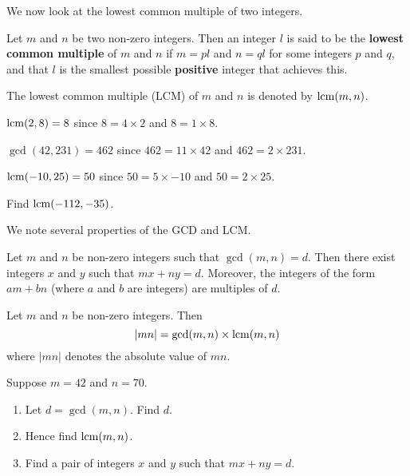 We now look at the lowest common multiple of two integers.
\begin{definition}
    Let $m$ and $n$ be two non-zero integers. Then an integer $l$ is said to be the \textbf{lowest common multiple} of $m$ and $n$ if $m = pl$ and $n = ql$ for some integers $p$ and $q$, and that $l$ is the smallest possible \textbf{positive} integer that achieves this.
\end{definition}
The lowest common multiple (LCM) of $m$ and $n$ is denoted by $\mathrm{lcm}(m,n)$.

\begin{example}
    $\mathrm{lcm}(2, 8) = 8$ since $8 = 4 \times 2$ and $8 = 1 \times 8$.
\end{example}
\begin{example}
    $\gcd(42, 231) = 462$ since $462 = 11 \times 42$ and $462 = 2 \times 231$.
\end{example}
\begin{example}
    $\mathrm{lcm}(-10, 25) = 50$ since $50 = 5 \times -10$ and $50 = 2 \times 25$.
\end{example}
\begin{exercise}
    Find $\mathrm{lcm}(-112, -35)$.
\end{exercise}

\newpage

We note several properties of the GCD and LCM.
\begin{lemma}[B\'{e}zout]\label{lemma-bezout}
    Let $m$ and $n$ be non-zero integers such that $\gcd(m, n) = d$. Then there exist integers $x$ and $y$ such that $mx + ny = d$. Moreover, the integers of the form $am + bn$ (where $a$ and $b$ are integers) are multiples of $d$.
\end{lemma}
\begin{proposition}
    Let $m$ and $n$ be non-zero integers. Then
    \[
        |mn| = \gcd(m,n) \times \mathrm{lcm}(m,n)    
    \]
    where $|mn|$ denotes the absolute value of $mn$.
\end{proposition}

\begin{exercise}
    Suppose $m = 42$ and $n = 70$.
    \begin{enumerate}[label=(\roman*)]
        \item Let $d = \gcd(m,n)$. Find $d$.
        \item Hence find $\mathrm{lcm}(m,n)$.
        \item Find a pair of integers $x$ and $y$ such that $mx + ny = d$.
    \end{enumerate}
\end{exercise}

